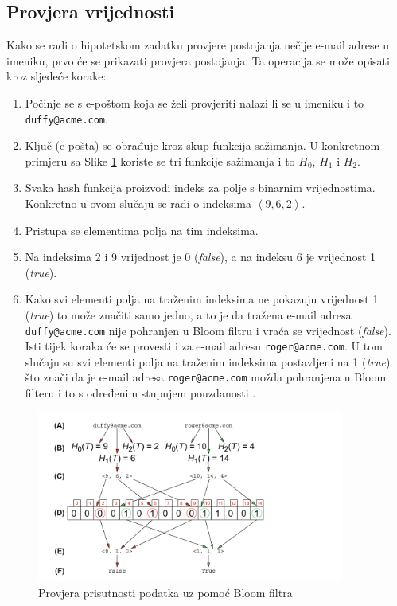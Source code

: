 \documentclass{foi}
\begin{document}
\subsection{Provjera vrijednosti}

Kako se radi o hipotetskom zadatku provjere postojanja nečije e-mail adrese u imeniku, prvo će se prikazati provjera postojanja. Ta operacija se može opisati kroz sljedeće korake:

\begin{enumerate}[label=\Alph*)]

\item Počinje se s e-poštom koja se želi provjeriti nalazi li se u imeniku i to \texttt{duffy@acme.com}.

\item Ključ (e-pošta) se obrađuje kroz skup funkcija sažimanja. U konkretnom primjeru sa Slike \ref{fig:vremena3} koriste se tri funkcije sažimanja i to $H_0$, $H_1$ i $H_2$.

\item Svaka hash funkcija proizvodi indeks za polje s binarnim vrijednostima. Konkretno u ovom slučaju se radi o indeksima $ \left\langle 9, 6, 2 \right\rangle$.

\item Pristupa se elementima polja na tim indeksima.

\item Na indeksima 2 i 9 vrijednost je 0 (\textit{false}), a na indeksu 6 je vrijednost 1 (\textit{true}).

\item Kako svi elementi polja na traženim indeksima ne pokazuju vrijednost 1 (\textit{true}) to može značiti samo jedno, a to je da tražena e-mail adresa \texttt{duffy@acme.com} nije pohranjen u Bloom filtru i vraća se vrijednost (\textit{false}). Isti tijek koraka će se provesti i za e-mail adresu \texttt{roger@acme.com}. U tom slučaju su svi elementi polja na traženim indeksima postavljeni na 1 (\textit{true}) što znači da je e-mail adresa \texttt{roger@acme.com} možda pohranjena u Bloom filteru i to s određenim stupnjem pouzdanosti \cite{la2021advanced}.
\end{enumerate}

\begin{figure}[H]
    \centering
    \includegraphics[width=0.9\textwidth, frame]{slike/input_.png}
    \caption{Provjera prisutnosti podatka uz pomoć Bloom filtra \cite{la2021advanced}}
    \label{fig:vremena3}
\end{figure}
\end{document}
